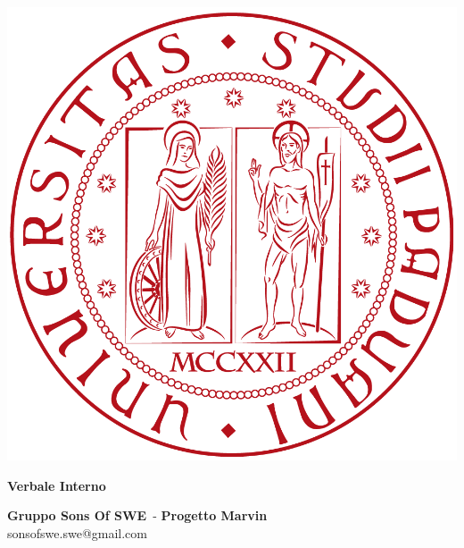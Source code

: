\documentclass[a4paper, oneside, openany]{article}
\makeatletter
\newcommand{\Titolo}{Verbale Interno}
\newcommand{\Gruppo}{Gruppo Sons Of SWE}
\newcommand{\Data}{5 aprile 2018}
\newcommand{\NomeProgetto}{Progetto Marvin}
\newcommand{\Mail}{sonsofswe.swe@gmail.com}
\makeatother
\begin{document}
\begin{titlepage}
  \begin{center}

  \begin{center}
   \centerline{\includegraphics[scale=0.24]{../template/img/logo.png}}
  \end{center}
  
  \vspace{1cm}

  \begin{Huge}
    \textbf{\Titolo{}} \\
  \end{Huge}

  \vspace{9pt}  
  
  \begin{large}
  	\textbf{\Gruppo{}}\ - \textbf{\NomeProgetto{}}\\%
  	\vspace{6pt}
  	\Mail{}
  \end{large}	  
  

\end{center}
\end{titlepage}
\end{document}
